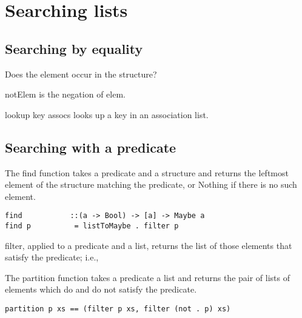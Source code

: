 \section{Searching lists}
\subsection{Searching by equality}

Does the element occur in the structure?

notElem is the negation of elem.

lookup key assocs looks up a key in an association list.

\subsection{Searching with a predicate}
The find function takes a predicate and a structure and returns the leftmost element of the structure matching the predicate, or Nothing if there is no such element.
\begin{lstlisting}[frame=single]
find           ::(a -> Bool) -> [a] -> Maybe a
find p          = listToMaybe . filter p
\end{lstlisting}

filter, applied to a predicate and a list, returns the list of those elements that satisfy the predicate; i.e.,

The partition function takes a predicate a list and returns the pair of lists of elements which do and do not satisfy the predicate.
\begin{lstlisting}[frame=single]
partition p xs == (filter p xs, filter (not . p) xs)
\end{lstlisting}